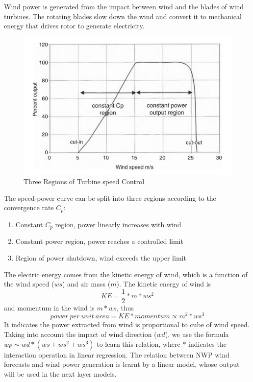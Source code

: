\documentclass[conference]{IEEEtran}
\begin{document}
Wind power is generated from the impact between wind and the blades of wind turbines. The rotating blades slow down the wind and convert it to mechanical energy that drives rotor to generate electricity. %
\begin{figure}[htb]
\centering
\includegraphics[width=0.8\columnwidth]{FIG/turbine}
\caption{Three Regions of Turbine speed Control \cite{patel2005wind}}
\label{fig:turbine}
\end{figure}
The speed-power curve can be split into three regions according to the convergence rate $C_p$:
\begin{enumerate}
    \item Constant $C_p$ region, power linearly increases with wind
    \item Constant power region, power reaches a controlled limit
    \item Region of power shutdown, wind exceeds the upper limit
\end{enumerate}
The electric energy comes from the kinetic energy of wind, which is a function of the wind speed ($ws$) and air mass ($m$). The kinetic energy of wind is
\begin{equation}
    KE = \frac{1}{2}*m*ws^2
\end{equation}
and momentum in the wind is $m*ws$, thus
\begin{equation}
    power\ per\ unit\ area = KE*momentum \propto m^2*ws^3
\end{equation}
It indicates the power extracted from wind is proportional to cube of wind speed. Taking into account the impact of wind direction ($wd$), we use the formula $wp \sim wd * (ws + ws^2 + ws^3)$ to learn this relation,
where $*$ indicates the interaction operation in linear regression. The relation between NWP wind forecasts and wind power generation is learnt by a linear model, whose output will be used in the next layer models.
\end{document}
